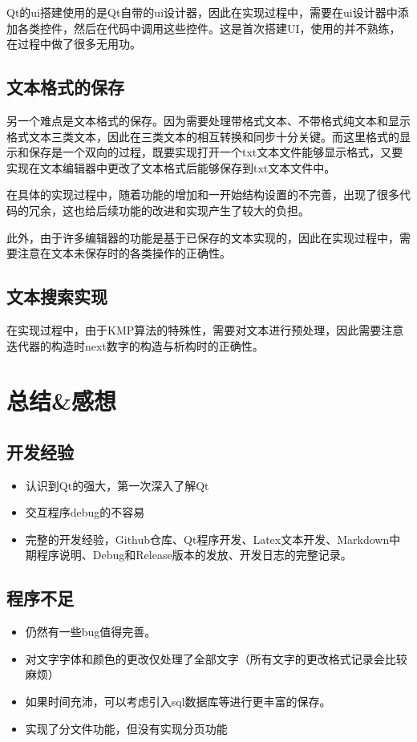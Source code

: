 \documentclass{./source/Report}
\begin{document}
Qt的ui搭建使用的是Qt自带的ui设计器，因此在实现过程中，需要在ui设计器中添加各类控件，然后在代码中调用这些控件。这是首次搭建UI，使用的并不熟练，在过程中做了很多无用功。

\subsection{文本格式的保存}
另一个难点是文本格式的保存。因为需要处理带格式文本、不带格式纯文本和显示格式文本三类文本，因此在三类文本的相互转换和同步十分关键。而这里格式的显示和保存是一个双向的过程，既要实现打开一个txt文本文件能够显示格式，又要实现在文本编辑器中更改了文本格式后能够保存到txt文本文件中。

在具体的实现过程中，随着功能的增加和一开始结构设置的不完善，出现了很多代码的冗余，这也给后续功能的改进和实现产生了较大的负担。

此外，由于许多编辑器的功能是基于已保存的文本实现的，因此在实现过程中，需要注意在文本未保存时的各类操作的正确性。

\subsection{文本搜索实现}
在实现过程中，由于KMP算法的特殊性，需要对文本进行预处理，因此需要注意迭代器的构造时next数字的构造与析构时的正确性。


\section{总结\&感想}
\subsection{开发经验}
\begin{itemize}
    \item 认识到Qt的强大，第一次深入了解Qt
    \item 交互程序debug的不容易
    \item 完整的开发经验，Github仓库、Qt程序开发、Latex文本开发、Markdown中期程序说明、Debug和Release版本的发放、开发日志的完整记录。
\end{itemize}
\subsection{程序不足}
\begin{itemize}
    \item 仍然有一些bug值得完善。
    \item 对文字字体和颜色的更改仅处理了全部文字（所有文字的更改格式记录会比较麻烦）
    \item 如果时间充沛，可以考虑引入sql数据库等进行更丰富的保存。
    \item 实现了分文件功能，但没有实现分页功能
\end{itemize}
\end{document}
